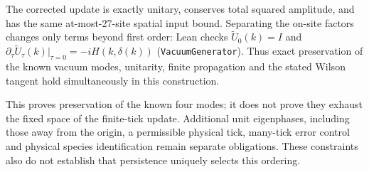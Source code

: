 The corrected update is exactly unitary, conserves total squared amplitude, and has the same at-most-27-site spatial input bound. Separating the on-site factors changes only terms beyond first order: Lean checks $\widetilde U_0(k)=I$ and $\partial_\tau\widetilde U_\tau(k)|_{\tau=0}=-iH(k,\delta(k))$ (\nolinkurl{VacuumGenerator}). Thus exact preservation of the known vacuum modes, unitarity, finite propagation and the stated Wilson tangent hold simultaneously in this construction.

This proves preservation of the known four modes; it does not prove they exhaust the fixed space of the finite-tick update. Additional unit eigenphases, including those away from the origin, a permissible physical tick, many-tick error control and physical species identification remain separate obligations. These constraints also do not establish that persistence uniquely selects this ordering.

